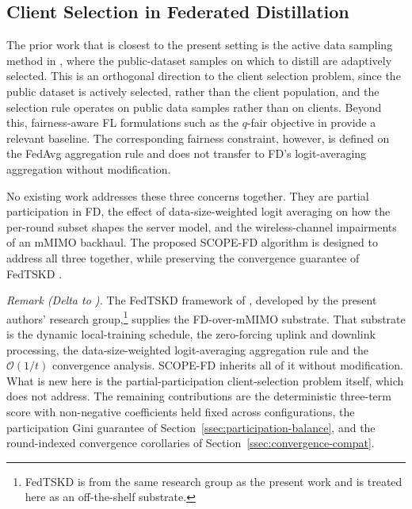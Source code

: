\documentclass[journal]{IEEEtran}
\newcommand{\rev}[1]{{\color{blue}#1}}
\begin{document}
\subsection{Client Selection in Federated Distillation}
\label{ssec:rw-fd-selection}

The prior work that is closest to the present setting is the active data sampling method in \cite{liu2022active}, where the public-dataset samples on which to distill are adaptively selected. This is an orthogonal direction to the client selection problem, since the public dataset is actively selected, rather than the client population, and the selection rule operates on public data samples rather than on clients. Beyond this, fairness-aware FL formulations such as the $q$-fair objective in \cite{li2020qffl} provide a relevant baseline. The corresponding fairness constraint, however, is defined on the FedAvg aggregation rule and does not transfer to FD's logit-averaging aggregation without modification.

No existing work addresses these three concerns together. They are partial participation in FD, the effect of data-size-weighted logit averaging on how the per-round subset shapes the server model, and the wireless-channel impairments of an mMIMO backhaul. The proposed SCOPE-FD algorithm is designed to address all three together, while preserving the convergence guarantee of FedTSKD \cite{mu2024fedtskd}.

\textit{Remark (Delta to \cite{mu2024fedtskd}).} The FedTSKD framework of \cite{mu2024fedtskd}, developed by the present authors' research group,\footnote{FedTSKD \cite{mu2024fedtskd} is from the same research group as the present work and is treated here as an off-the-shelf substrate.} supplies the FD-over-mMIMO substrate. That substrate is the dynamic local-training schedule, the zero-forcing uplink and downlink processing, the data-size-weighted logit-averaging aggregation rule and the $\mathcal{O}(1/t)$ convergence analysis. SCOPE-FD inherits all of it without modification. What is new here is the partial-participation client-selection problem itself, which \cite{mu2024fedtskd} does not address. The remaining contributions are the deterministic three-term score with non-negative coefficients held fixed across configurations, the participation Gini guarantee of Section~\ref{ssec:participation-balance}, and \rev{the round-indexed convergence corollaries of Section~\ref{ssec:convergence-compat}.}

\end{document}
